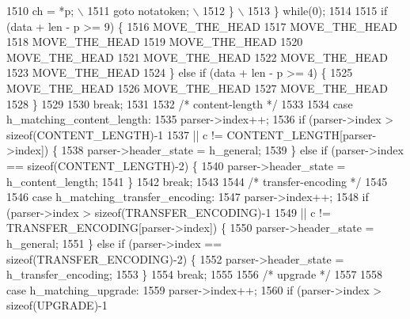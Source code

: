 \begin{DoxyCode}
1510 \textcolor{preprocessor}{                  ch = *p;               \(\backslash\)}
1511 \textcolor{preprocessor}{                  goto notatoken;        \(\backslash\)}
1512 \textcolor{preprocessor}{                \}                        \(\backslash\)}
1513 \textcolor{preprocessor}{              \} while(0);}
1514 
1515               \textcolor{keywordflow}{if} (data + len - p >= 9) \{
1516                 MOVE_THE_HEAD
1517                 MOVE_THE_HEAD
1518                 MOVE_THE_HEAD
1519                 MOVE_THE_HEAD
1520                 MOVE_THE_HEAD
1521                 MOVE_THE_HEAD
1522                 MOVE_THE_HEAD
1523                 MOVE_THE_HEAD
1524               \} \textcolor{keywordflow}{else} \textcolor{keywordflow}{if} (data + len - p >= 4) \{
1525                 MOVE_THE_HEAD
1526                 MOVE_THE_HEAD
1527                 MOVE_THE_HEAD
1528               \}
1529 
1530               \textcolor{keywordflow}{break};
1531 
1532             \textcolor{comment}{/* content-length */}
1533 
1534             \textcolor{keywordflow}{case} h_matching_content_length:
1535               parser->index++;
1536               \textcolor{keywordflow}{if} (parser->index > \textcolor{keyword}{sizeof}(CONTENT_LENGTH)-1
1537                   || c != CONTENT_LENGTH[parser->index]) \{
1538                 parser->header_state = h_general;
1539               \} \textcolor{keywordflow}{else} \textcolor{keywordflow}{if} (parser->index == \textcolor{keyword}{sizeof}(CONTENT_LENGTH)-2) \{
1540                 parser->header_state = h_content_length;
1541               \}
1542               \textcolor{keywordflow}{break};
1543 
1544             \textcolor{comment}{/* transfer-encoding */}
1545 
1546             \textcolor{keywordflow}{case} h_matching_transfer_encoding:
1547               parser->index++;
1548               \textcolor{keywordflow}{if} (parser->index > \textcolor{keyword}{sizeof}(TRANSFER_ENCODING)-1
1549                   || c != TRANSFER_ENCODING[parser->index]) \{
1550                 parser->header_state = h_general;
1551               \} \textcolor{keywordflow}{else} \textcolor{keywordflow}{if} (parser->index == \textcolor{keyword}{sizeof}(TRANSFER_ENCODING)-2) \{
1552                 parser->header_state = h_transfer_encoding;
1553               \}
1554               \textcolor{keywordflow}{break};
1555 
1556             \textcolor{comment}{/* upgrade */}
1557 
1558             \textcolor{keywordflow}{case} h_matching_upgrade:
1559               parser->index++;
1560               \textcolor{keywordflow}{if} (parser->index > \textcolor{keyword}{sizeof}(UPGRADE)-1

\end{DoxyCode}
